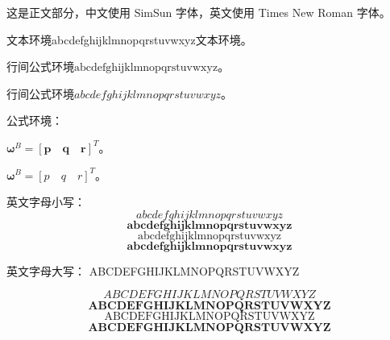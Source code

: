 \documentclass{article}
\begin{document}
这是正文部分，中文使用 SimSun 字体，英文使用 Times New Roman 字体。

文本环境abcdefghijklmnopqrstuvwxyz文本环境。

行间公式环境$\mathup{abcdefghijklmnopqrstuvwxyz}$。

行间公式环境${abcdefghijklmnopqrstuvwxyz}$。

公式环境：

${{\boldsymbol{\omega }}^{B}}=[\boldsymbol{p \quad q \quad r}]^{T}$。

${{\boldsymbol{\omega }}^{B}}=[p \quad q \quad r]^{T}$。

英文字母小写：
\begin{equation}
  abcdefghijklmnopqrstuvwxyz 
\end{equation}
\begin{equation}
  \boldsymbol{abcdefghijklmnopqrstuvwxyz} 
\end{equation}
\begin{equation}
  \mathrm{abcdefghijklmnopqrstuvwxyz}
\end{equation}
\begin{equation}
  \mathbf{abcdefghijklmnopqrstuvwxyz}
\end{equation}

英文字母大写：
ABCDEFGHIJKLMNOPQRSTUVWXYZ

\begin{equation}
  ABCDEFGHIJKLMNOPQRSTUVWXYZ 
\end{equation}
\begin{equation}
  \boldsymbol{ABCDEFGHIJKLMNOPQRSTUVWXYZ} 
\end{equation}
\begin{equation}
  \mathrm{ABCDEFGHIJKLMNOPQRSTUVWXYZ}
\end{equation}
\begin{equation}
  \mathbf{ABCDEFGHIJKLMNOPQRSTUVWXYZ}
\end{equation}
\end{document}
